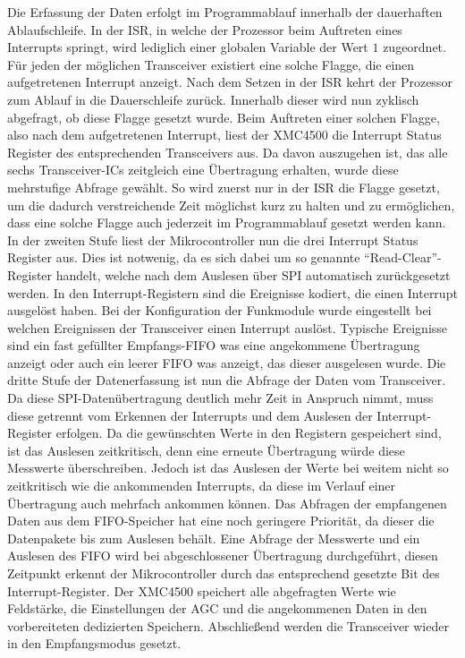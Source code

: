 Die Erfassung der Daten erfolgt im Programmablauf innerhalb der dauerhaften Ablaufschleife.
In der \acf{ISR}, in welche der Prozessor beim Auftreten eines Interrupts springt, wird lediglich einer globalen Variable der Wert $1$ zugeordnet. Für jeden der möglichen Transceiver existiert eine solche Flagge, die einen aufgetretenen Interrupt anzeigt. Nach dem Setzen in der \ac{ISR} kehrt der Prozessor zum Ablauf in die Dauerschleife zurück. Innerhalb dieser wird nun zyklisch abgefragt, ob diese Flagge gesetzt wurde. Beim Auftreten einer solchen Flagge, also nach dem aufgetretenen Interrupt, liest der XMC4500 die  Interrupt Status Register des entsprechenden Transceivers aus. 
Da davon auszugehen ist, das alle sechs Transceiver-\acp{IC} zeitgleich eine Übertragung erhalten, wurde diese mehrstufige Abfrage gewählt. So wird zuerst nur in der \ac{ISR} die Flagge gesetzt, um die dadurch verstreichende Zeit möglichst kurz zu halten und zu ermöglichen, dass eine solche Flagge auch jederzeit im Programmablauf gesetzt werden kann. In der zweiten Stufe liest der Mikrocontroller nun die drei Interrupt Status Register aus. Dies ist notwenig, da es sich dabei um so genannte \enquote{Read-Clear}-Register handelt, welche  nach dem Auslesen über SPI automatisch zurückgesetzt werden.
In den Interrupt-Registern sind die Ereignisse kodiert, die einen Interrupt ausgelöst haben. Bei der Konfiguration der Funkmodule wurde eingestellt bei welchen Ereignissen der Transceiver einen Interrupt auslöst. Typische Ereignisse sind ein fast gefüllter Empfangs-\ac{FIFO} was eine angekommene Übertragung anzeigt oder auch ein leerer \ac{FIFO} was anzeigt, das dieser ausgelesen wurde. 
Die dritte Stufe  der Datenerfassung ist nun die Abfrage der Daten vom Transceiver. Da diese \ac{SPI}-Datenübertragung deutlich mehr Zeit in Anspruch nimmt, muss diese getrennt vom Erkennen der Interrupts und dem Auslesen der Interrupt-Register erfolgen. Da die gewünschten Werte in den Registern gespeichert sind, ist das Auslesen zeitkritisch, denn eine erneute Übertragung würde diese Messwerte überschreiben. Jedoch ist das Auslesen der Werte bei weitem nicht so zeitkritisch wie die ankommenden Interrupts, da diese im Verlauf einer Übertragung auch mehrfach ankommen können. Das Abfragen der empfangenen Daten aus dem \ac{FIFO}-Speicher hat eine noch geringere Priorität, da dieser die Datenpakete bis zum Auslesen behält. Eine Abfrage der Messwerte und ein Auslesen des \ac{FIFO} wird bei abgeschlossener Übertragung durchgeführt, diesen Zeitpunkt erkennt der Mikrocontroller durch das entsprechend gesetzte Bit des Interrupt-Register. Der XMC4500 speichert alle abgefragten Werte wie Feldstärke, die Einstellungen der \ac{AGC} und die angekommenen Daten in den vorbereiteten dedizierten Speichern. Abschließend werden die Transceiver wieder in den Empfangsmodus gesetzt. 

